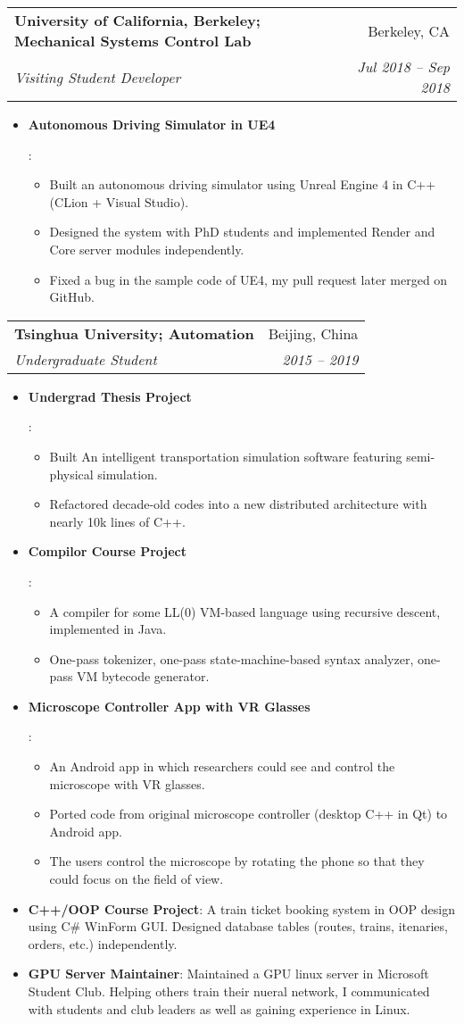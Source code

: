 \documentclass[letterpaper,11pt]{article}
\makeatletter
\newcommand{\resumeItem}[2]{
  \item\small{
    \textbf{#1}{: #2 \vspace{-2pt}}
  }
}
\newcommand{\resumeSubheading}[4]{
  \vspace{-1pt}\item
    \begin{tabular*}{0.97\textwidth}[t]{l@{\extracolsep{\fill}}r}
      \textbf{#1} & #2 \\
      \textit{\small#3} & \textit{\small #4} \\
    \end{tabular*}\vspace{-5pt}
}
\newcommand{\resumeItemListStart}{\begin{itemize}}
\newcommand{\resumeItemListEnd}{\end{itemize}\vspace{-5pt}}
\makeatother
\begin{document}
    \resumeSubheading
      {University of California, Berkeley; Mechanical Systems Control Lab}{Berkeley, CA}
      {Visiting Student Developer}{Jul 2018 -- Sep 2018}
      \resumeItemListStart
        \resumeItem{Autonomous Driving Simulator in UE4}{
          \begin{itemize}
            \item Built an autonomous driving simulator using Unreal Engine 4 in C++ (CLion + Visual Studio).
            \item Designed the system with PhD students and implemented Render and Core server modules independently.
            \item Fixed a bug in the sample code of UE4, my pull request later merged on GitHub. 
          \end{itemize}
        }
      \resumeItemListEnd

    \resumeSubheading
      {Tsinghua University; Automation}{Beijing, China}
      {Undergraduate Student}{2015 -- 2019}
      \resumeItemListStart
        \resumeItem{Undergrad Thesis Project}{
          \begin{itemize}
            \item Built An intelligent transportation simulation software featuring semi-physical simulation.
            \item Refactored decade-old codes into a new distributed architecture with nearly 10k lines of C++.
          \end{itemize}
        }
        \resumeItem{Compilor Course Project}{
          \begin{itemize}
            \item A compiler for some LL(0) VM-based language using recursive descent, implemented in Java.
            \item One-pass tokenizer, one-pass state-machine-based syntax analyzer, one-pass VM bytecode generator.
          \end{itemize}
        }
        \resumeItem{Microscope Controller App with VR Glasses}{
          \begin{itemize}
            \item An Android app in which researchers could see and control the microscope with VR glasses.
            \item Ported code from original microscope controller (desktop C++ in Qt) to Android app.
            \item The users control the microscope by rotating the phone so that they could focus on the field of view.
          \end{itemize}
        }
        \resumeItem{C++/OOP Course Project}{
          A train ticket booking system in OOP design using C\# WinForm GUI.
          Designed database tables (routes, trains, itenaries, orders, etc.) independently.
        }
        \resumeItem{GPU Server Maintainer}{
          Maintained a GPU linux server in Microsoft Student Club.
          Helping others train their nueral network, I communicated with students and club leaders as well as gaining experience in Linux.
        }
      \resumeItemListEnd
\end{document}
